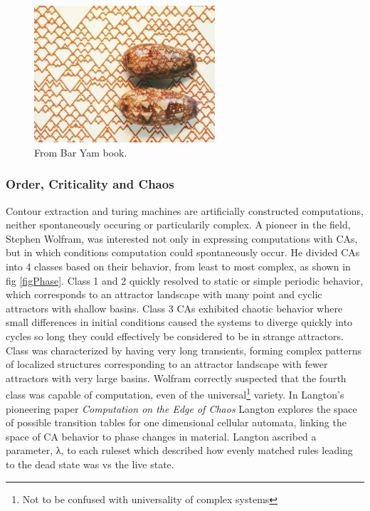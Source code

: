 \begin{figure}[h!]
  \centering
  \includegraphics[width=0.6\textwidth]{fig/CApattern.png}
  \caption{From Bar Yam book.}
  \label{figCX}
\end{figure}
\subsubsection{Order, Criticality and Chaos}
Contour extraction and turing machines are artificially constructed
computations, neither spontaneously occuring or particularily complex.
A pioneer in the field, Stephen Wolfram, was interested not only in expressing
computations with CAs, but in which conditions computation could spontaneously
occur.
He divided CAs into 4 classes based on their behavior, from least to most
complex, as shown in fig \ref{figPhase}.
Class 1 and 2 quickly resolved to static or simple periodic behavior, which
corresponds to an attractor landscape with many point and cyclic attractors with
shallow basins.
Class 3 CAs exhibited chaotic behavior where small differences in initial
conditions caused the systems to diverge quickly into cycles so long they could
effectively be considered to be in strange attractors.
Class was characterized by having very long transients, forming complex
patterns of localized structures corresponding to an attractor landscape with
fewer attractors with very large basins.
Wolfram correctly suspected that the fourth class was capable of computation,
even of the universal\footnote{Not to be confused with
  universality of complex systems} variety.
%
In Langton's pioneering paper \emph{Computation on the Edge of Chaos}
\cite{langton_computation_1990} Langton explores the space of possible
transition tables for one dimensional cellular automata, linking the space of CA
behavior to phase changes in material.
%
Langton ascribed a parameter, λ, to each ruleset which described how evenly
matched rules leading to the dead state was vs the live state.
